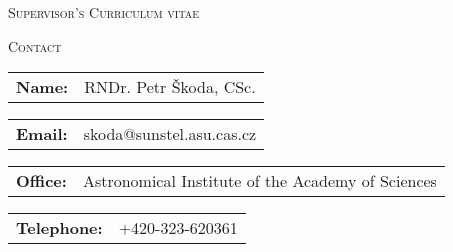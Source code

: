 \begin{cv}
\smallskip
\vspace{-1.2cm}
\begin{center}
 {\large \textsc{Supervisor's Curriculum vitae}\\ 
}\end{center}
 \vspace{-0.1 cm}

\setlength{\oldcvlabelwidth}{\cvlabelwidth}
\setlength{\oldcvlabelsep}{\cvlabelsep}

\setlength{\cvlabelwidth}{1em} 
\noindent\hrulefill
\begin{cvlist}{\large \textsc{Contact}}
\item \begin{tabular}{p{2cm}p{11cm}}  {\bf{Name:}} & RNDr. Petr \v Skoda, CSc.\\
   \end{tabular}
 \item \begin{tabular}{p{2cm}p{11cm}}  
  {\bf{Email:}} & skoda@sunstel.asu.cas.cz\\
   \end{tabular}
  \item \begin{tabular}{p{2cm}p{11cm}}
  {\bf{Office:}} & Astronomical Institute of the Academy of Sciences\\
   \end{tabular}
   \item \begin{tabular}{p{2cm}p{11cm}}
  {\bf{Telephone:}} & +420-323-620361\\
   \end{tabular}
\end{cvlist}



\end{cv}
